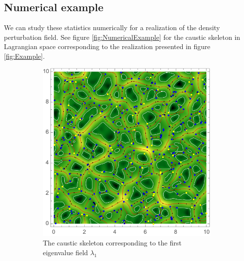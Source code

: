 \documentclass[a4paper, 11pt]{article}
\begin{document}
\subsection{Numerical example}
We can study these statistics numerically for a realization of the density perturbation field. See figure \ref{fig:NumericalExample} for the caustic skeleton in Lagrangian space corresponding to the realization presented in figure \ref{fig:Example}. 

\begin{figure}
\centering
\begin{subfigure}[b]{0.49\textwidth}
\includegraphics[width=\textwidth]{Lambda1}
\caption{The caustic skeleton corresponding to the first eigenvalue field $\lambda_1$}
\end{subfigure}
\begin{subfigure}[b]{0.49\textwidth}

\end{subfigure}
\end{figure}
\end{document}
